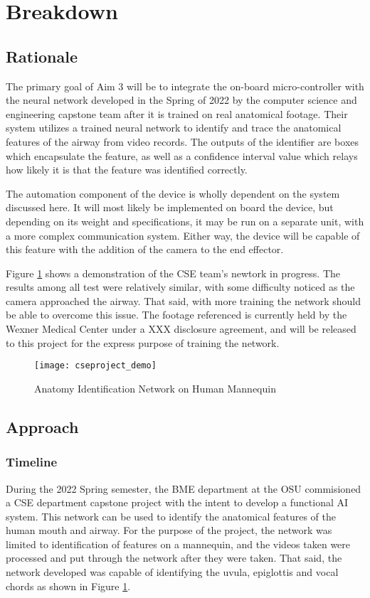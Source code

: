 \section{Breakdown}

\subsection{Rationale}

	The primary goal of Aim 3 will be to integrate the on-board micro-controller with the neural network developed in the Spring of 2022 by the computer science and engineering capstone team after it is trained on real anatomical footage. Their system utilizes a trained neural network to identify and trace the anatomical features of the airway from video records. The outputs of the identifier are boxes which encapsulate the feature, as well as a confidence interval value which relays how likely it is that the feature was identified correctly.

	The automation component of the device is wholly dependent on the system discussed here. It will most likely be implemented on board the device, but depending on its weight and specifications, it may be run on a separate unit, with a more complex communication system. Either way, the device will be capable of this feature with the addition of the camera to the end effector.
	
	Figure \ref{fig:cseproject_demo} shows a demonstration of the CSE team's newtork in progress. The results among all test were relatively similar, with some difficulty noticed as the camera approached the airway. That said, with more training the network should be able to overcome this issue. The footage referenced is currently held by the Wexner Medical Center under a XXX disclosure agreement, and will be released to this project for the express purpose of training the network.
	
	\begin{figure}[ht]
		\centering
		\texttt{[image: cseproject\_demo]}
		\caption{Anatomy Identification Network on Human Mannequin}
		\label{fig:cseproject_demo}
	\end{figure}

\subsection{Approach}

	\subsubsection{Timeline}
		During the 2022 Spring semester, the BME department at the OSU commisioned a CSE department capstone project with the intent to develop a functional AI system. This network can be used to identify the anatomical features of the human mouth and airway. For the purpose of the project, the network was limited to identification of features on a mannequin, and the videos taken were processed and put through the network after they were taken. That said, the network developed was capable of identifying the uvula, epiglottis and vocal chords as shown in Figure \ref{fig:cseproject_demo}.
		
